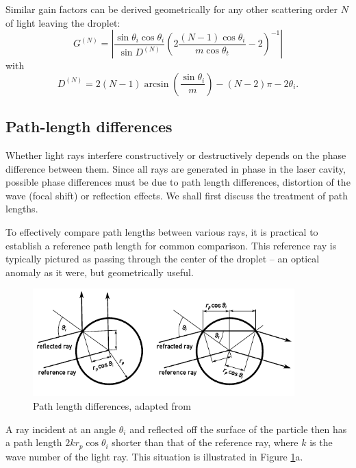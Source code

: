 \documentclass[11.5pt,oneside]{book}
\begin{document}
Similar gain factors can be derived geometrically for any other scattering order $N$ of light
leaving the droplet:
\begin{equation}
    \label{eq:gainfactor}
    G^{(N)} = \left| \frac{\sin \theta_i \cos \theta_i}{\sin D^{(N)}} \left(2
    \frac{(N-1)\cos \theta_i}{m \cos \theta_t} - 2\right)^{-1} \right|
\end{equation}
with
\begin{equation}
    D^{(N)} = 2(N-1) \arcsin \left(\frac{\sin \theta_i}{m}\right) - (N-2)\pi -
    2\theta_i.
\end{equation}

\subsection{Path-length differences}
Whether light rays interfere constructively or destructively depends on the
phase difference between them. Since all rays are generated in phase in the
laser cavity, possible phase differences must be due to path length differences,
distortion of the wave (focal shift) or reflection effects. We shall first
discuss the treatment of path lengths.

To effectively compare path lengths between various rays, it is practical to
establish a reference path length for common comparison. This reference ray is
typically pictured as passing through the center of the droplet -- an optical
anomaly as it were, but geometrically useful.

\begin{figure}
\centering
\includegraphics[width=0.9\textwidth]{img/scattering/pathlength.pdf}
\caption{Path length differences, adapted from \citet{Albrecht03}}
\label{fig:pathlength}
\end{figure}

A ray incident at an angle $\theta_i$ and reflected off the surface of the
particle then has a path length $2kr_p \cos \theta_i$ shorter than that of the
reference ray, where $k$ is the wave number of the light ray. This situation is
illustrated in Figure \ref{fig:pathlength}a.
\end{document}
